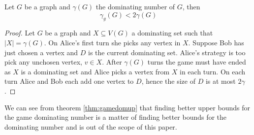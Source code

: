 \begin{theorem}\label{thm:gamedomup}
    Let $G$ be a graph and $\gamma(G)$ the dominating number of $G$, then 
    \[\gamma_g(G)<2\gamma(G)\]
\end{theorem}
\begin{proof}
    Let $G$ be a graph and $X\subseteq V(G)$ a dominating set such that $|X| = \gamma(G)$. On Alice's first turn she picks any vertex in $X$. Suppose Bob has just chosen a vertex and $D$ is the current dominating set. Alice's strategy is too pick any unchosen vertex, $v\in X$. After $\gamma(G)$ turns the game must have ended as $X$ is a dominating set and Alice picks a vertex from $X$ in each turn. On each turn Alice and Bob each add one vertex to $D$, hence the size of $D$ is at most $2\gamma$.
\end{proof}

We can see from theorem \ref{thm:gamedomup} that finding better upper bounds for the game dominating number is a matter of finding better bounds for the dominating number and is out of the scope of this paper. 


